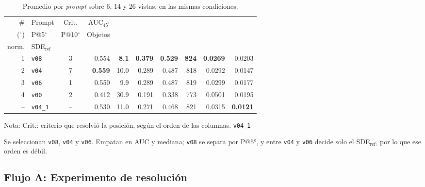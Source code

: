 \begin{table}[H]
\centering
\caption{Promedio por \textit{prompt} sobre 6, 14 y 26 vistas, en las mismas condiciones.}
\label{tab:axis_top_prompts}
\footnotesize
\setlength{\tabcolsep}{3pt}
\renewcommand{\arraystretch}{0.95}

\begin{tabular*}{\textwidth}{@{\extracolsep{\fill}}rlcrrrrrrr@{}}
\toprule
\# & Prompt & Crit. & AUC$_{45^\circ}$ & \begin{tabular}[b]{@{}c@{}}Mediana \\ ($^\circ$)\end{tabular} & P@5$^\circ$ & P@10$^\circ$ & Objetos & \begin{tabular}[b]{@{}c@{}}Trasl. \\ norm.\end{tabular} & SDE$_{\mathrm{ref}}$ \\
\midrule
1 & \texttt{v08} & 3 & 0.554 & \textbf{8.1} & \textbf{0.379} & \textbf{0.529} & \textbf{824} & \textbf{0.0269} & 0.0203 \\
2 & \texttt{v04} & 7 & \textbf{0.559} & 10.0 & 0.289 & 0.487 & 818 & 0.0292 & 0.0147 \\
3 & \texttt{v06} & 1 & 0.550 & 9.9 & 0.289 & 0.487 & 819 & 0.0299 & 0.0177 \\
4 & \texttt{v00} & 2 & 0.412 & 30.9 & 0.191 & 0.338 & 773 & 0.0501 & 0.0195 \\
-- & \texttt{v04\_1} & -- & 0.530 & 11.0 & 0.271 & 0.468 & 821 & 0.0315 & \textbf{0.0121} \\
\bottomrule
\end{tabular*}

\vspace{0.5ex}
\begin{minipage}{\textwidth}
Nota: Crit.: criterio que resolvió la posición, según el orden de las columnas. \texttt{v04\_1} 
\end{minipage}
\end{table}


Se seleccionan \texttt{v08}, \texttt{v04} y \texttt{v06}. Empatan en AUC y mediana; \texttt{v08} se separa por P@$5°$, y entre \texttt{v04} y \texttt{v06} decide solo el SDE$_{\mathrm{ref}}$, por lo que ese orden es débil. 







\newpage
\subsection{Flujo A: Experimento de resolución}

